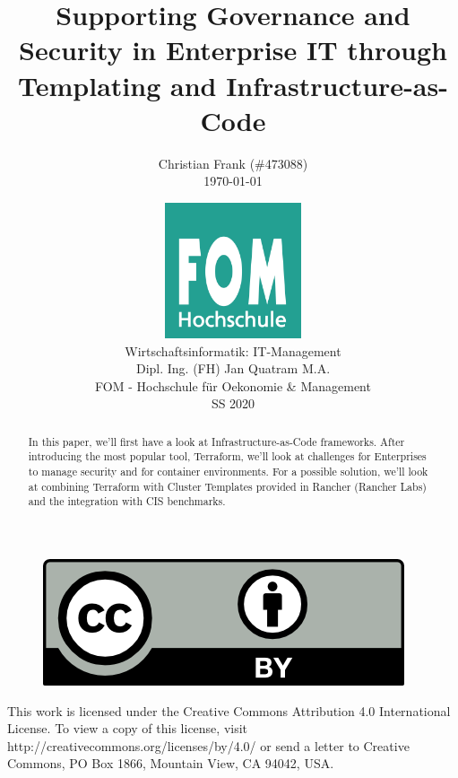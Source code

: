 \documentclass[12pt,a4paper,listof=totoc,bibliography=totoc]{scrartcl}
\newcommand\svthema{Supporting Governance and Security in Enterprise IT through Templating and Infrastructure-as-Code}
\newcommand\svperson{Christian Frank (\#473088)}
\newcommand\svdatum{\today}
\newcommand\lvname{Wirtschaftsinformatik: IT-Management}
\newcommand\lvtyp{SS 2020}
\newcommand\lvinst{FOM - Hochschule für Oekonomie \& Management}
\newcommand\lvbetr{Dipl. Ing. (FH) Jan Quatram M.A.}
\begin{document}
\title{ \huge\textbf{\svthema} }
\author{ {\svperson} \\ \svdatum }
\date{ \normalsize \centering \includegraphics[width=0.3\textwidth]{FOM}\\ {\lvname} \\ {\lvbetr} \\ {\lvinst} \\ {\lvtyp} }

\pagestyle{fancy}
\fancyhf{}
\fancyhf[ch]{\thepage}
\renewcommand\headrulewidth{0pt}

\maketitle
\thispagestyle{empty} %

\begin{abstract}
In this paper, we'll first have a look at Infrastructure-as-Code frameworks. After introducing the most popular tool, Terraform, we'll look at challenges for Enterprises to manage security and for container environments.
For a possible solution, we'll look at combining Terraform with Cluster Templates provided in Rancher (Rancher Labs) and the integration with CIS benchmarks.

\end{abstract}

\vfill
\begin{figure}[h]
    \centering
    \includegraphics[]{CC-BY}
\end{figure}

This work is licensed under the Creative Commons Attribution 4.0 International License. To view a copy of this license, visit http://creativecommons.org/licenses/by/4.0/ or send a letter to Creative Commons, PO Box 1866, Mountain View, CA 94042, USA.
\end{document}
